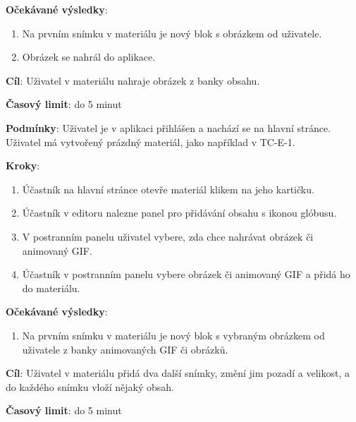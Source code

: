 \textbf{Očekávané výsledky}:

\begin{enumerate}[leftmargin=1.4cm]
    \item Na prvním snímku v materiálu je nový blok s obrázkem od uživatele.
    \item Obrázek se nahrál do aplikace.
\end{enumerate}






\vspace{1em}

\textbf{Cíl}: Uživatel v materiálu nahraje obrázek z banky obsahu.

\textbf{Časový limit}: do 5 minut

\textbf{Podmínky}:  Uživatel je v aplikaci přihlášen a nachází se na hlavní stránce. Uživatel má vytvořený prázdný materiál, jako například v TC-E-1.

\textbf{Kroky}:

\begin{enumerate}[leftmargin=1.4cm]
    \item Účastník na hlavní stránce otevře materiál klikem na jeho kartičku.
    \item Účastník v editoru nalezne panel pro přidávání obsahu s ikonou glóbusu.
    \item V postranním panelu uživatel vybere, zda chce nahrávat obrázek či animovaný GIF.
    \item Účastník v postranním panelu vybere obrázek či animovaný GIF a přidá ho do materiálu.
\end{enumerate}

\textbf{Očekávané výsledky}:

\begin{enumerate}[leftmargin=1.4cm]
    \item Na prvním snímku v materiálu je nový blok s vybraným obrázkem od uživatele z banky animovaných GIF či obrázků.
\end{enumerate}






\vspace{1em}

\textbf{Cíl}: Uživatel v materiálu přidá dva další snímky, změní jim pozadí a velikost, a do každého snímku vloží nějaký obsah.

\textbf{Časový limit}: do 5 minut

